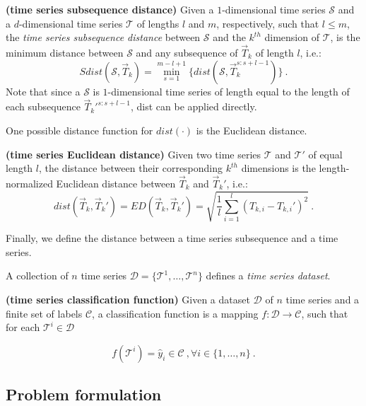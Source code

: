 \documentclass[smallextended,natbib]{svjour3}
\begin{document}
\begin{definition} \textbf{(time series sub\-sequence distance)} 
Given a $1$-dimensional time series $\mathcal{S}$ and a $d$-dimensional time series $\mathcal{T}$ of lengths $l$ and $m$, respectively, such that $l \leq m$, the \emph{time series sub\-sequence distance} between $\mathcal{S}$ and the $k^{th}$ dimension of $\mathcal{T}$, is the minimum distance between $\mathcal{S}$ and any sub\-sequence of $\vec{T}_k$ of length $l$, i.e.:
\begin{equation}
  Sdist(\mathcal{S}, \vec{T}_k) = \min_{s=1}^{m-l+1} \{ 
  dist (\mathcal{S}, \vec{T}_k^{s:s+l-1}) \} \ .
\end{equation}
Note that since a $\mathcal{S}$ is $1$-dimensional time series of length equal to the length of each sub\-sequence $\vec{T}_k'^{s:s+l-1}$, dist can be applied directly.
\end{definition}

One possible distance function for $dist(\cdot)$ is the Euclidean distance.
\begin{definition} \textbf{(time series Euclidean distance)} %
Given two time series $\mathcal{T}$ and $\mathcal{T'}$ of equal length $l$, the distance between their corresponding $k^{th}$ dimensions is the length-normalized Euclidean distance between $\vec{T}_k$ and $\vec{T}_k'$, i.e.:
\begin{equation}
 dist(\vec{T}_k,\vec{T}_k') = ED (\vec{T}_k,\vec{T}_k') =  \sqrt{\frac{1}{l} \sum_{i=1}^{l}(T_{k,i}-T_{k,i}')^2} \ .
\end{equation}
 
\end{definition}
Finally, we define the distance between a time series sub\-sequence and a time series.

A collection of $n$ time series $\mathcal{D} = \{\mathcal{T}^{1},\ldots,\mathcal{T}^{n}\}$ defines a \emph{time series dataset}. 

\begin{definition} \textbf{(time series classification function)} %
  Given a dataset $\mathcal{D}$ of $n$ time series and a finite set of
  labels $\mathcal{C}$, a classification function is a mapping
  $f : \mathcal{D} \rightarrow \mathcal{C}$, such that for each
  $\mathcal{T}^{i}\in \mathcal{D}$

\[
f(\mathcal{T}^{i}) = \hat{y}_i\in \mathcal{C} \ ,
  \forall i\in \{1,\dots,n\} \ .
\]
\end{definition}

\subsection{Problem formulation}
\end{document}
